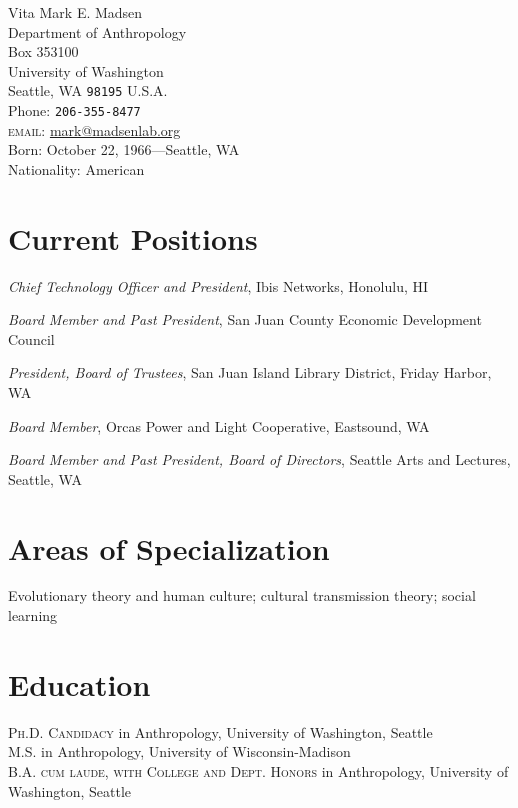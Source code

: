 \documentclass[11pt, letter]{article}
\newcommand{\years}[1]{\marginnote{\scriptsize #1}}
\begin{document}
\thispagestyle{empty}
\begin{center}
{\LARGE Vita}
\vskip 1cm 
\textsf{\LARGE Mark E. Madsen}\\[1cm]
Department of Anthropology\\
Box 353100\\
University of Washington\\
Seattle, WA \texttt{98195}
U.S.A.\\[.2cm]
Phone: \texttt{206-355-8477}\\[.2cm]
\textsc{email}: \href{mailto:mark@madsenlab.org}{mark@madsenlab.org}\\
\vskip 1cm
Born:  October 22, 1966---Seattle, WA\\
Nationality:  American
\end{center}

\section*{Current Positions}
\emph{Chief Technology Officer and President}, Ibis Networks, Honolulu, HI

\emph{Board Member and Past President}, San Juan County Economic Development Council

\emph{President, Board of Trustees}, San Juan Island Library District, Friday Harbor, WA

\emph{Board Member}, Orcas Power and Light Cooperative, Eastsound, WA

\emph{Board Member and Past President, Board of Directors}, Seattle Arts and Lectures, Seattle, WA






\section*{Areas of Specialization}
Evolutionary theory and human culture; cultural transmission theory; social learning

\section*{Education}

\noindent\years{2012}\textsc{Ph.D. Candidacy} in Anthropology, University of Washington, Seattle\\
\noindent\years{1990}\textsc{M.S.} in Anthropology, University of Wisconsin-Madison\\
\years{1988}\textsc{B.A. cum laude, with College and Dept. Honors} in Anthropology, University of Washington, Seattle
\end{document}
